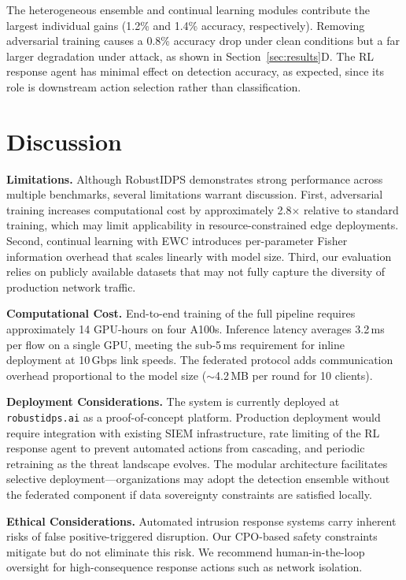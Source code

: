 \documentclass[journal,twoside]{IEEEtran}
\begin{document}
The heterogeneous ensemble and continual learning modules contribute the largest individual gains (1.2\% and 1.4\% accuracy, respectively). Removing adversarial training causes a 0.8\% accuracy drop under clean conditions but a far larger degradation under attack, as shown in Section~\ref{sec:results}D. The RL response agent has minimal effect on detection accuracy, as expected, since its role is downstream action selection rather than classification.

\section{Discussion}
\label{sec:discussion}

\textbf{Limitations.} Although RobustIDPS demonstrates strong performance across multiple benchmarks, several limitations warrant discussion. First, adversarial training increases computational cost by approximately 2.8$\times$ relative to standard training, which may limit applicability in resource-constrained edge deployments. Second, continual learning with EWC introduces per-parameter Fisher information overhead that scales linearly with model size. Third, our evaluation relies on publicly available datasets that may not fully capture the diversity of production network traffic.

\textbf{Computational Cost.} End-to-end training of the full pipeline requires approximately 14 GPU-hours on four A100s. Inference latency averages 3.2\,ms per flow on a single GPU, meeting the sub-5\,ms requirement for inline deployment at 10\,Gbps link speeds. The federated protocol adds communication overhead proportional to the model size ($\sim$4.2\,MB per round for 10 clients).

\textbf{Deployment Considerations.} The system is currently deployed at \texttt{robustidps.ai} as a proof-of-concept platform. Production deployment would require integration with existing SIEM infrastructure, rate limiting of the RL response agent to prevent automated actions from cascading, and periodic retraining as the threat landscape evolves. The modular architecture facilitates selective deployment---organizations may adopt the detection ensemble without the federated component if data sovereignty constraints are satisfied locally.

\textbf{Ethical Considerations.} Automated intrusion response systems carry inherent risks of false positive-triggered disruption. Our CPO-based safety constraints mitigate but do not eliminate this risk. We recommend human-in-the-loop oversight for high-consequence response actions such as network isolation.
\end{document}
